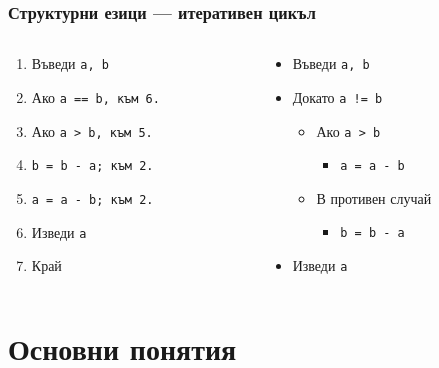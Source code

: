 \documentclass{beamer}
\begin{document}
\begin{frame}
  \frametitle{Структурни езици — итеративен цикъл}

  \begin{columns}[t,onlytextwidth]
    \begin{column}{.5\textwidth}
      \begin{enumerate}
      \item Въведи \tt a, \tt b
      \item Ако \tt{a == b}, към 6.
      \item Ако \tt{a > b}, към 5.
      \item \tt{b = b - a}; към 2.
      \item \tt{a = a - b}; към 2.
      \item Изведи \tt a
      \item Край
      \end{enumerate}
    \end{column}
    \begin{column}{.5\textwidth}
      \begin{itemize}
      \item Въведи \tt a, \tt b
      \item Докато \tt{a != b}
        \begin{itemize}
        \item Ако \tt{a > b}
          \begin{itemize}
          \item \tt{a = a - b}
          \end{itemize}
        \item В противен случай
          \begin{itemize}
          \item \tt{b = b - a}
          \end{itemize}
        \end{itemize}
      \item Изведи \tt a
      \end{itemize}
    \end{column}
  \end{columns}
\end{frame}

\section{Основни понятия}
\end{document}
